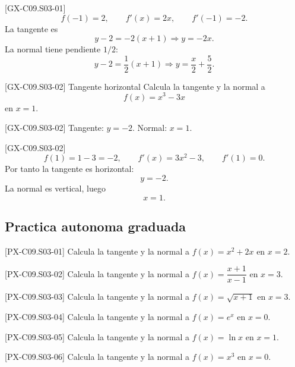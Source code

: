 \begin{fullsolution}{[GX-C09.S03-01]}
\[
f(-1)=2,\qquad f'(x)=2x,\qquad f'(-1)=-2.
\]
La tangente es
\[
y-2=-2(x+1)\Longrightarrow y=-2x.
\]
La normal tiene pendiente \(1/2\):
\[
y-2=\frac{1}{2}(x+1)\Longrightarrow y=\frac{x}{2}+\frac{5}{2}.
\]
\end{fullsolution}

\begin{guidedexercise}{[GX-C09.S03-02] Tangente horizontal}
Calcula la tangente y la normal a
\[
f(x)=x^3-3x
\]
en \(x=1\).
\end{guidedexercise}

\begin{shortanswer}{[GX-C09.S03-02]}
Tangente: \(y=-2\). Normal: \(x=1\).
\end{shortanswer}

\begin{fullsolution}{[GX-C09.S03-02]}
\[
f(1)=1-3=-2,\qquad f'(x)=3x^2-3,\qquad f'(1)=0.
\]
Por tanto la tangente es horizontal:
\[
y=-2.
\]
La normal es vertical, luego
\[
x=1.
\]
\end{fullsolution}

\subsection*{Practica autonoma graduada}
\begin{exercise}{[PX-C09.S03-01] Calcula la tangente y la normal a \(f(x)=x^2+2x\) en \(x=2\).}
\end{exercise}
\begin{exercise}{[PX-C09.S03-02] Calcula la tangente y la normal a \(f(x)=\dfrac{x+1}{x-1}\) en \(x=3\).}
\end{exercise}
\begin{exercise}{[PX-C09.S03-03] Calcula la tangente y la normal a \(f(x)=\sqrt{x+1}\) en \(x=3\).}
\end{exercise}
\begin{exercise}{[PX-C09.S03-04] Calcula la tangente y la normal a \(f(x)=e^x\) en \(x=0\).}
\end{exercise}
\begin{exercise}{[PX-C09.S03-05] Calcula la tangente y la normal a \(f(x)=\ln x\) en \(x=1\).}
\end{exercise}
\begin{exercise}{[PX-C09.S03-06] Calcula la tangente y la normal a \(f(x)=x^3\) en \(x=0\).}
\end{exercise}

